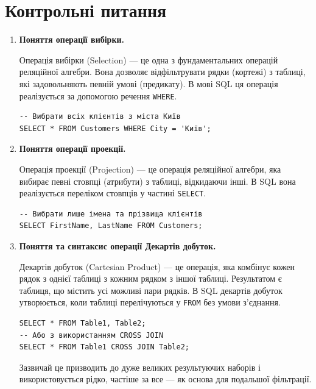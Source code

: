 \documentclass{article}
\begin{document}
    \section*{Контрольні питання}
    \begin{enumerate}[label=\arabic*., leftmargin=*]
        \item \textbf{Поняття операції вибірки.}
        
        Операція вибірки (Selection) — це одна з фундаментальних операцій реляційної алгебри. Вона дозволяє відфільтрувати рядки (кортежі) з таблиці, які задовольняють певній умові (предикату). В мові SQL ця операція реалізується за допомогою речення \texttt{WHERE}.
        \begin{CodeBox}
        \begin{verbatim}
-- Вибрати всіх клієнтів з міста Київ
SELECT * FROM Customers WHERE City = 'Київ';
        \end{verbatim}
        \end{CodeBox}

        \item \textbf{Поняття операції проекції.}
        
        Операція проекції (Projection) — це операція реляційної алгебри, яка вибирає певні стовпці (атрибути) з таблиці, відкидаючи інші. В SQL вона реалізується переліком стовпців у частині \texttt{SELECT}.
        \begin{CodeBox}
        \begin{verbatim}
-- Вибрати лише імена та прізвища клієнтів
SELECT FirstName, LastName FROM Customers;
        \end{verbatim}
        \end{CodeBox}
        
        \item \textbf{Поняття та синтаксис операції Декартів добуток.}
        
        Декартів добуток (Cartesian Product) — це операція, яка комбінує кожен рядок з однієї таблиці з кожним рядком з іншої таблиці. Результатом є таблиця, що містить усі можливі пари рядків. В SQL декартів добуток утворюється, коли таблиці перелічуються у \texttt{FROM} без умови з'єднання.
        \begin{CodeBox}
        \begin{verbatim}
SELECT * FROM Table1, Table2;
-- Або з використанням CROSS JOIN
SELECT * FROM Table1 CROSS JOIN Table2;
        \end{verbatim}
        \end{CodeBox}
        Зазвичай це призводить до дуже великих результуючих наборів і використовується рідко, частіше за все — як основа для подальшої фільтрації.


\end{enumerate}
\end{document}
